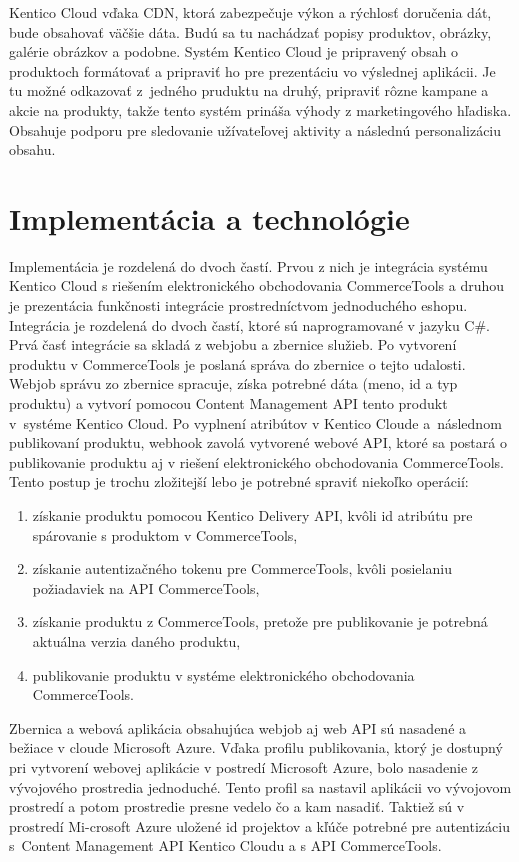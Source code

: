 \documentclass[
  printed, %
  table,   %
  lof,     %
  nolot,     %
  twoside,  
]{fithesis3}
\begin{document}
Kentico Cloud vďaka CDN, ktorá zabezpečuje výkon a rýchlosť doručenia dát, bude obsahovať väčšie dáta. Budú sa tu nachádzať popisy produktov, obrázky, galérie obrázkov a podobne. Systém Kentico Cloud je pripravený obsah o produktoch formátovať a pripraviť ho pre prezentáciu vo výslednej aplikácii. Je tu možné odkazovať z~jedného pruduktu na druhý, pripraviť rôzne kampane a akcie na produkty, takže tento systém prináša výhody z marketingového hľadiska. Obsahuje podporu pre sledovanie užívateľovej aktivity a následnú personalizáciu obsahu.

\chapter{Implementácia a technológie}
Implementácia je rozdelená do dvoch častí. Prvou z nich je integrácia systému Kentico Cloud s riešením elektronického obchodovania CommerceTools a druhou je prezentácia funkčnosti integrácie prostredníctvom jednoduchého eshopu.  
Integrácia je rozdelená do dvoch častí, ktoré sú naprogramované v jazyku C\#. Prvá časť integrácie sa skladá z webjobu a zbernice služieb. Po vytvorení produktu v CommerceTools je poslaná správa do zbernice o tejto udalosti. Webjob správu zo zbernice spracuje, získa potrebné dáta (meno, id a typ produktu) a vytvorí pomocou Content Management API tento produkt v~systéme Kentico Cloud. Po vyplnení atribútov v Kentico Cloude a~následnom publikovaní produktu, webhook zavolá vytvorené webové API, ktoré sa postará o publikovanie produktu aj v riešení elektronického obchodovania CommerceTools. Tento postup je trochu zložitejší lebo je potrebné spraviť niekoľko operácií: 
\begin{enumerate}
	\item získanie produktu pomocou Kentico Delivery API, kvôli id atribútu pre spárovanie s produktom v CommerceTools,
	\item získanie autentizačného tokenu pre CommerceTools, kvôli posielaniu požiadaviek na API CommerceTools,
	\item získanie produktu z CommerceTools, pretože pre publikovanie je potrebná aktuálna verzia daného produktu,
	\item publikovanie produktu v systéme elektronického obchodovania CommerceTools.
\end{enumerate}

Zbernica a webová aplikácia obsahujúca webjob aj web API sú nasadené a bežiace v cloude Microsoft Azure. Vďaka profilu publikovania, ktorý je dostupný pri vytvorení webovej aplikácie v postredí Microsoft Azure, bolo nasadenie z vývojového prostredia jednoduché. Tento profil sa nastavil aplikácii vo vývojovom prostredí a potom prostredie presne vedelo čo a kam nasadiť. Taktiež sú v prostredí Mi-crosoft Azure uložené id projektov a kľúče potrebné pre autentizáciu s~Content Management API Kentico Cloudu a s API CommerceTools. 
\end{document}
